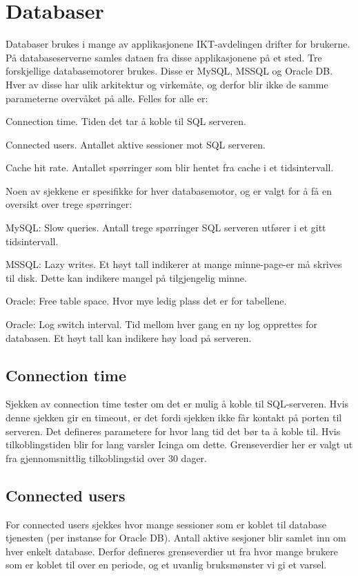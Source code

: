 \section{Databaser}
Databaser brukes i mange av applikasjonene IKT-avdelingen drifter for brukerne. På databaseserverne samles dataen fra disse applikasjonene på et sted. 
Tre forskjellige databasemotorer brukes. Disse er MySQL, MSSQL og Oracle DB. Hver av disse har ulik arkitektur og virkemåte\cite{databasecomparison}, og derfor blir ikke de samme parameterne overvåket på alle. Felles for alle er:
\begin{itemize*}
	\item Connection time. Tiden det tar å koble til SQL serveren.
	\item Connected users. Antallet aktive sessioner mot SQL serveren.
	\item Cache hit rate. Antallet spørringer som blir hentet fra cache i et tidsintervall.
\end{itemize*}

Noen av sjekkene er spesifikke for hver databasemotor, og er valgt for å få en oversikt over trege spørringer:
\begin{itemize*}
\item MySQL: Slow queries. Antall trege spørringer SQL serveren utfører i et gitt tidsintervall.
\item MSSQL: Lazy writes. Et høyt tall indikerer at mange minne-page-er må skrives til disk. Dette kan indikere mangel på tilgjengelig minne.
\item Oracle: Free table space. Hvor mye ledig plass det er for tabellene.
\item Oracle: Log switch interval. Tid mellom hver gang en ny log opprettes for databasen. Et høyt tall kan indikere høy load på serveren.
\end{itemize*}

\subsection*{Connection time}
Sjekken av connection time tester om det er mulig å koble til SQL-serveren. Hvis denne sjekken gir en timeout, er det fordi sjekken ikke får kontakt på porten til serveren. Det defineres parametere for hvor lang tid det bør ta å koble til. Hvis tilkoblingstiden blir for lang varsler Icinga om dette. Grenseverdier her er valgt ut fra gjennomsnittlig tilkoblingstid over 30 dager.

\subsection*{Connected users}
For connected users sjekkes hvor mange sessioner som er koblet til database tjenesten (per instanse for Oracle DB). Antall aktive sesjoner blir samlet inn om hver enkelt database. Derfor defineres grenseverdier ut fra hvor mange brukere som er koblet til over en periode, og et uvanlig bruksmønster vi gi et varsel.


